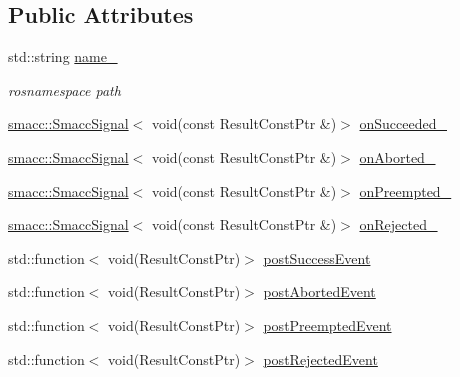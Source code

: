 \subsection*{Public Attributes}
\begin{DoxyCompactItemize}
\item 
std\+::string \hyperlink{classsmacc_1_1client__bases_1_1SmaccActionClientBase_a7f2e1834e915bdf7ae9db8b90b4597e6}{name\+\_\+}
\begin{DoxyCompactList}\small\item\em rosnamespace path \end{DoxyCompactList}\item 
\hyperlink{classsmacc_1_1SmaccSignal}{smacc\+::\+Smacc\+Signal}$<$ void(const Result\+Const\+Ptr \&)$>$ \hyperlink{classsmacc_1_1client__bases_1_1SmaccActionClientBase_afa1d615e16c9e825d815a3a3ccaa61df}{on\+Succeeded\+\_\+}
\item 
\hyperlink{classsmacc_1_1SmaccSignal}{smacc\+::\+Smacc\+Signal}$<$ void(const Result\+Const\+Ptr \&)$>$ \hyperlink{classsmacc_1_1client__bases_1_1SmaccActionClientBase_adc33748ca4fcef9730f8039b75d496d0}{on\+Aborted\+\_\+}
\item 
\hyperlink{classsmacc_1_1SmaccSignal}{smacc\+::\+Smacc\+Signal}$<$ void(const Result\+Const\+Ptr \&)$>$ \hyperlink{classsmacc_1_1client__bases_1_1SmaccActionClientBase_a23846f928b48b5da809690883044b14b}{on\+Preempted\+\_\+}
\item 
\hyperlink{classsmacc_1_1SmaccSignal}{smacc\+::\+Smacc\+Signal}$<$ void(const Result\+Const\+Ptr \&)$>$ \hyperlink{classsmacc_1_1client__bases_1_1SmaccActionClientBase_a4c878cbf2684701323e2b36668f7d721}{on\+Rejected\+\_\+}
\item 
std\+::function$<$ void(Result\+Const\+Ptr)$>$ \hyperlink{classsmacc_1_1client__bases_1_1SmaccActionClientBase_afb4f82508cd653d496392f321e84a783}{post\+Success\+Event}
\item 
std\+::function$<$ void(Result\+Const\+Ptr)$>$ \hyperlink{classsmacc_1_1client__bases_1_1SmaccActionClientBase_a9ca2952ededeec233ee6d8a9a39c680b}{post\+Aborted\+Event}
\item 
std\+::function$<$ void(Result\+Const\+Ptr)$>$ \hyperlink{classsmacc_1_1client__bases_1_1SmaccActionClientBase_a9513e302d447b04aafbca574d37a9ecc}{post\+Preempted\+Event}
\item 
std\+::function$<$ void(Result\+Const\+Ptr)$>$ \hyperlink{classsmacc_1_1client__bases_1_1SmaccActionClientBase_a04cb60c48127e5534c1ce7045fb5abdc}{post\+Rejected\+Event}
\item 

\end{DoxyCompactItemize}
